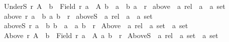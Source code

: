 \begin{isabellebody}
\ \ \ {\isachardoublequoteopen}UnderS\ r\ A\ {\isasymequiv}\ {\isacharbraceleft}{\kern0pt}b\ {\isasymin}\ Field\ r{\isachardot}{\kern0pt}\ {\isasymforall}a\ {\isasymin}\ A{\isachardot}{\kern0pt}\ b\ {\isasymnoteq}\ a\ {\isasymand}\ {\isacharparenleft}{\kern0pt}b{\isacharcomma}{\kern0pt}\ a{\isacharparenright}{\kern0pt}\ {\isasymin}\ r{\isacharbraceright}{\kern0pt}{\isachardoublequoteclose}\isanewline
\isanewline
{}\isamarkupfalse%
\ above\ {\isacharcolon}{\kern0pt}{\isacharcolon}{\kern0pt}\ {\isachardoublequoteopen}{\isacharprime}{\kern0pt}a\ rel\ {\isasymRightarrow}\ {\isacharprime}{\kern0pt}a\ {\isasymRightarrow}\ {\isacharprime}{\kern0pt}a\ set{\isachardoublequoteclose}\isanewline
\ \ \ {\isachardoublequoteopen}above\ r\ a\ {\isasymequiv}\ {\isacharbraceleft}{\kern0pt}b{\isachardot}{\kern0pt}\ {\isacharparenleft}{\kern0pt}a{\isacharcomma}{\kern0pt}\ b{\isacharparenright}{\kern0pt}\ {\isasymin}\ r{\isacharbraceright}{\kern0pt}{\isachardoublequoteclose}\isanewline
\isanewline
{}\isamarkupfalse%
\ aboveS\ {\isacharcolon}{\kern0pt}{\isacharcolon}{\kern0pt}\ {\isachardoublequoteopen}{\isacharprime}{\kern0pt}a\ rel\ {\isasymRightarrow}\ {\isacharprime}{\kern0pt}a\ {\isasymRightarrow}\ {\isacharprime}{\kern0pt}a\ set{\isachardoublequoteclose}\isanewline
\ \ \ {\isachardoublequoteopen}aboveS\ r\ a\ {\isasymequiv}\ {\isacharbraceleft}{\kern0pt}b{\isachardot}{\kern0pt}\ b\ {\isasymnoteq}\ a\ {\isasymand}\ {\isacharparenleft}{\kern0pt}a{\isacharcomma}{\kern0pt}\ b{\isacharparenright}{\kern0pt}\ {\isasymin}\ r{\isacharbraceright}{\kern0pt}{\isachardoublequoteclose}\isanewline
\isanewline
{}\isamarkupfalse%
\ Above\ {\isacharcolon}{\kern0pt}{\isacharcolon}{\kern0pt}\ {\isachardoublequoteopen}{\isacharprime}{\kern0pt}a\ rel\ {\isasymRightarrow}\ {\isacharprime}{\kern0pt}a\ set\ {\isasymRightarrow}\ {\isacharprime}{\kern0pt}a\ set{\isachardoublequoteclose}\isanewline
\ \ \ {\isachardoublequoteopen}Above\ r\ A\ {\isasymequiv}\ {\isacharbraceleft}{\kern0pt}b\ {\isasymin}\ Field\ r{\isachardot}{\kern0pt}\ {\isasymforall}a\ {\isasymin}\ A{\isachardot}{\kern0pt}\ {\isacharparenleft}{\kern0pt}a{\isacharcomma}{\kern0pt}\ b{\isacharparenright}{\kern0pt}\ {\isasymin}\ r{\isacharbraceright}{\kern0pt}{\isachardoublequoteclose}\isanewline
\isanewline
{}\isamarkupfalse%
\ AboveS\ {\isacharcolon}{\kern0pt}{\isacharcolon}{\kern0pt}\ {\isachardoublequoteopen}{\isacharprime}{\kern0pt}a\ rel\ {\isasymRightarrow}\ {\isacharprime}{\kern0pt}a\ set\ {\isasymRightarrow}\ {\isacharprime}{\kern0pt}a\ set{\isachardoublequoteclose}\isanewline

\end{isabellebody}

